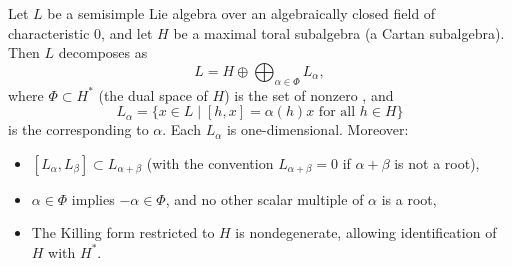 Let $L$ be a semisimple Lie algebra over an algebraically closed field of characteristic 0, and let $H$ be a maximal toral subalgebra (a Cartan subalgebra). Then $L$ decomposes as
$$L = H \oplus \bigoplus_{\alpha \in \Phi} L_\alpha,$$
where $\Phi \subset H^*$ (the dual space of $H$) is the set of nonzero , and
$$L_\alpha = \{x \in L \mid [h, x] = \alpha(h)x \text{ for all } h \in H\}$$
is the  corresponding to $\alpha$. Each $L_\alpha$ is one-dimensional. Moreover:
\begin{itemize}
\item $[L_\alpha, L_\beta] \subset L_{\alpha+\beta}$ (with the convention $L_{\alpha+\beta} = 0$ if $\alpha+\beta$ is not a root),
\item $\alpha \in \Phi$ implies $-\alpha \in \Phi$, and no other scalar multiple of $\alpha$ is a root,
\item The Killing form restricted to $H$ is nondegenerate, allowing identification of $H$ with $H^*$.
\end{itemize}
